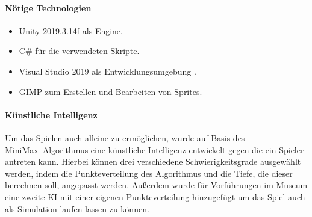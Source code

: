 \paragraph{Nötige Technologien}
\begin{itemize}
	\item Unity 2019.3.14f als Engine.
	\item C\# für die verwendeten Skripte.
	\item Visual Studio 2019 als Entwicklungsumgebung .
	\item GIMP zum Erstellen und Bearbeiten von Sprites.
\end{itemize}

\paragraph{Künstliche Intelligenz}
Um das Spielen auch alleine zu ermöglichen, wurde auf Basis des MiniMax~Algorithmus eine künstliche Intelligenz entwickelt gegen die ein Spieler antreten kann. Hierbei können drei verschiedene Schwierigkeitsgrade ausgewählt werden, indem die Punkteverteilung des Algorithmus und die Tiefe, die dieser berechnen soll, angepasst werden. Außerdem wurde für Vorführungen im Museum eine zweite KI mit einer eigenen Punkteverteilung hinzugefügt um das Spiel auch als Simulation laufen lassen zu können.




